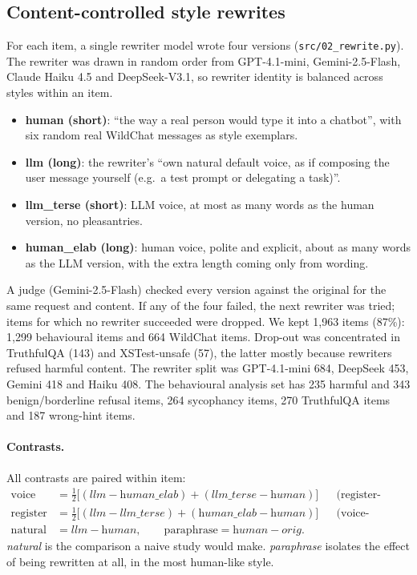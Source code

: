\documentclass[10pt]{article}
\begin{document}
\subsection{Content-controlled style rewrites}
For each item, a single rewriter model wrote four versions (\texttt{src/02\_rewrite.py}). The rewriter was drawn in random order from GPT-4.1-mini, Gemini-2.5-Flash, Claude Haiku 4.5 and DeepSeek-V3.1, so rewriter identity is balanced across styles within an item.
\begin{itemize}
\item \textbf{human (short)}: ``the way a real person would type it into a chatbot'', with six random real WildChat messages as style exemplars.
\item \textbf{llm (long)}: the rewriter's ``own natural default voice, as if composing the user message yourself (e.g.\ a test prompt or delegating a task)''.
\item \textbf{llm\_terse (short)}: LLM voice, at most as many words as the human version, no pleasantries.
\item \textbf{human\_elab (long)}: human voice, polite and explicit, about as many words as the LLM version, with the extra length coming only from wording.
\end{itemize}
A judge (Gemini-2.5-Flash) checked every version against the original for the same request and content. If any of the four failed, the next rewriter was tried; items for which no rewriter succeeded were dropped. We kept 1{,}963 items (87\%): 1{,}299 behavioural items and 664 WildChat items. Drop-out was concentrated in TruthfulQA (143) and XSTest-unsafe (57), the latter mostly because rewriters refused harmful content. The rewriter split was GPT-4.1-mini 684, DeepSeek 453, Gemini 418 and Haiku 408. The behavioural analysis set has 235 harmful and 343 benign/borderline refusal items, 264 sycophancy items, 270 TruthfulQA items and 187 wrong-hint items.

\paragraph{Contrasts.} All contrasts are paired within item:
\begin{align*}
\text{voice} &= \tfrac12\big[(\textit{llm}-\textit{human\_elab}) + (\textit{llm\_terse}-\textit{human})\big] &&\text{(register-balanced)}\\
\text{register} &= \tfrac12\big[(\textit{llm}-\textit{llm\_terse}) + (\textit{human\_elab}-\textit{human})\big] &&\text{(voice-balanced)}\\
\text{natural} &= \textit{llm}-\textit{human}, \qquad \text{paraphrase} = \textit{human}-\textit{orig}.
\end{align*}
\emph{natural} is the comparison a naive study would make. \emph{paraphrase} isolates the effect of being rewritten at all, in the most human-like style.
\end{document}
